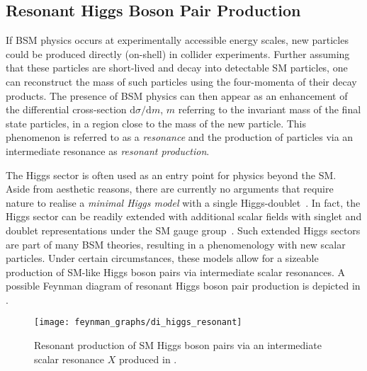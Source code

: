 

\subsection{Resonant Higgs Boson Pair Production}%
\label{sec:bsm_resonant_hh}

If BSM physics occurs at experimentally accessible energy scales, new particles
could be produced directly (on-shell) in collider experiments. Further assuming
that these particles are short-lived and decay into detectable SM particles, one
can reconstruct the mass of such particles using the four-momenta of their decay
products. The presence of BSM physics can then appear as an enhancement of the
differential cross-section $\mathrm{d}\sigma / \mathrm{d}m$, $m$ referring to
the invariant mass of the final state particles, in a region close to the mass
of the new particle. This phenomenon is referred to as a \emph{resonance} and
the production of particles via an intermediate resonance as \emph{resonant
  production}.

The Higgs sector is often used as an entry point for physics beyond the
SM. Aside from aesthetic reasons, there are currently no arguments that require
nature to realise a \emph{minimal Higgs model} with a single
Higgs-doublet~\cite{Gunion:1989we}. In fact, the Higgs sector can be readily
extended with additional scalar fields with singlet and doublet representations
under the SM gauge group~\cite{Gunion:1989we}. Such extended Higgs sectors are
part of many BSM theories, resulting in a phenomenology with new scalar
particles. Under certain circumstances, these models allow for a sizeable
production of SM-like Higgs boson pairs via intermediate scalar resonances. A
possible Feynman diagram of resonant Higgs boson pair production is depicted in
.

\begin{figure}[htbp]
  \centering

  \texttt{[image: feynman\_graphs/di\_higgs\_resonant]}

  \caption{Resonant production of SM Higgs boson pairs via an intermediate
    scalar resonance $X$ produced in \ggF.}%
  \label{fig:resonant_production_feyn}
\end{figure}

